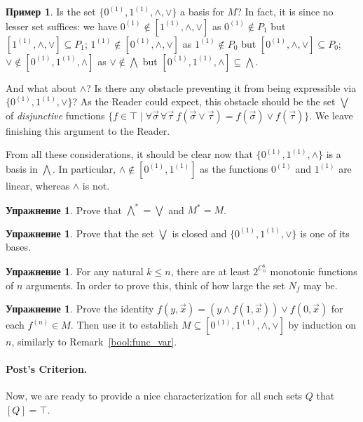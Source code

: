 \documentclass[12pt,notitlepage]{article}
\theoremstyle{plain}
\theoremstyle{definition}
\newtheorem{exc}[thm]{Упражнение}
\newtheorem{exm}[thm]{Пример}
\theoremstyle{plain}
\newcommand{\sbs}{\subseteq}
\newcommand{\1}{\mathbf{1}}
\newcommand{\0}{\mathbf{0}}
\begin{document}
\begin{exm}
	Is the set $\{0^{(1)}, 1^{(1)}, {\wedge},  {\vee}\}$ a basis for $M$? In fact, it is since no lesser set suffices: we have $0^{(1)} \notin [1^{(1)}, {\wedge},  {\vee}]$ as $0^{(1)} \notin P_1$ but $[1^{(1)}, {\wedge},  {\vee}] \sbs P_1$; $1^{(1)} \notin [0^{(1)}, {\wedge},  {\vee}]$ as $1^{(1)} \notin P_0$ but $[0^{(1)}, {\wedge},  {\vee}] \sbs P_0$; ${\vee} \notin [0^{(1)}, 1^{(1)}, {\wedge}]$ as ${\vee} \notin {\bigwedge}$ but $[0^{(1)}, 1^{(1)}, {\wedge}] \sbs {\bigwedge}$.
	
	And what about ${\wedge}$? Is there any obstacle preventing it from being expressible via $\{0^{(1)}, 1^{(1)}, {\vee}\}$? As the Reader could expect, this obstacle should be the set ${\bigvee}$ of \emph{disjunctive} functions $\{ f \in \top \mid \forall \vec \sigma\, \forall \vec \tau\  f(\vec \sigma \vee \vec \tau) = f(\vec \sigma) \vee f(\vec \tau) \}$. We leave finishing this argument to the Reader.
	
	From all these considerations, it should be clear now that $\{0^{(1)}, 1^{(1)}, {\wedge}\}$ is a basis in ${\bigwedge}$. In particular, ${\wedge} \notin [0^{(1)}, 1^{(1)}]$ as the functions $0^{(1)}$ and $1^{(1)}$ are linear, whereas ${\wedge}$ is not.
\end{exm}

\begin{exc}
	Prove that ${\bigwedge}^* = {\bigvee}$ and $M^* = M$.
\end{exc}

\begin{exc}
	Prove that the set ${\bigvee}$ is closed and $\{0^{(1)}, 1^{(1)}, {\vee}\}$ is one of its bases.
\end{exc}

\begin{exc}
	For any natural $k \leq n$, there are at least $2^{C_n^k}$ monotonic functions of $n$ arguments. In order to prove this, think of how large the set $N_f$ may be.
\end{exc}

\begin{exc}
	Prove the identity $f(y, \vec x) = (y \wedge f(1, \vec x)) \vee f(0, \vec x)$ for each $f^{(n)} \in M$. Then use it to establish $M \sbs [0^{(1)}, 1^{(1)}, {\wedge},  {\vee}]$ by induction on $n$, similarly to Remark~\ref{bool:func_var}.
\end{exc}


\paragraph{Post's Criterion.} Now, we are ready to provide a nice characterization for all such sets $Q$ that $[Q] = \top$.
\end{document}
